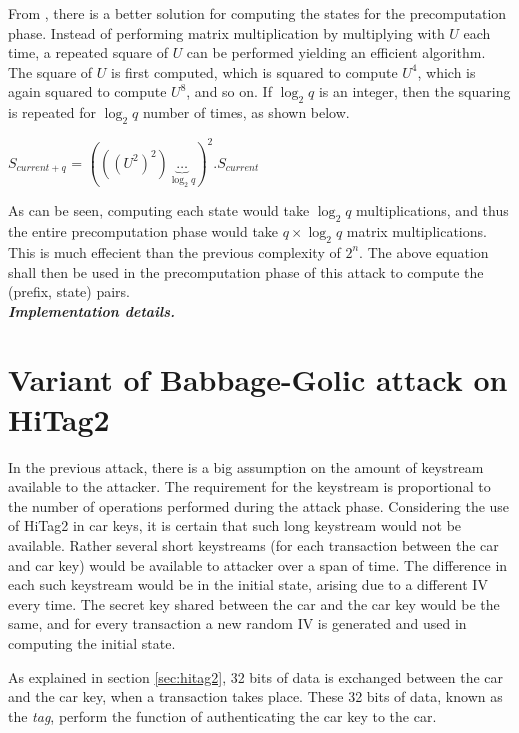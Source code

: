 From \cite{erik-discussions}, there is a better solution for computing the states for the precomputation phase. Instead of performing matrix multiplication by multiplying with $U$ each time, a repeated square of $U$ can be performed yielding an efficient algorithm. The square of $U$ is first computed, which is squared to compute $U^4$, which is again squared to compute $U^8$, and so on. If $\log_2{q}$ is an integer, then the squaring is repeated for $\log_2{q}$ number of times, as shown below.

\begin{center}
\large{$S_{current + q}$ = $(((U^2)^2) \underbrace{\dotsc}_{\log_2{q}})^2 . S_{current}$}\\
\end{center}
\label{eq:state-trans}

As can be seen, computing each state would take $\log_2{q}$ multiplications, and thus the entire precomputation phase would take $q \times \log_2{q}$ matrix multiplications. This is much effecient than the previous complexity of $2^n$. The above equation shall then be used in the precomputation phase of this attack to compute the (prefix, state) pairs.\\

\textit{\textbf{Implementation details.}}

\section{Variant of Babbage-Golic attack on HiTag2}
In the previous attack, there is a big assumption on the amount of keystream available to the attacker. The requirement for the keystream is proportional to the number of operations performed during the attack phase. Considering the use of HiTag2 in car keys, it is certain that such long keystream would not be available. Rather several short keystreams (for each transaction between the car and car key) would be available to attacker over a span of time. The difference in each such keystream would be in the initial state, arising due to a different IV every time. The secret key shared between the car and the car key would be the same, and for every transaction a new random IV is generated and used in computing the initial state. 

As explained in section \ref{sec:hitag2}, 32 bits of data is exchanged between the car and the car key, when a transaction takes place. These 32 bits of data, known as the \emph{tag}, perform the function of authenticating the car key to the car. 

